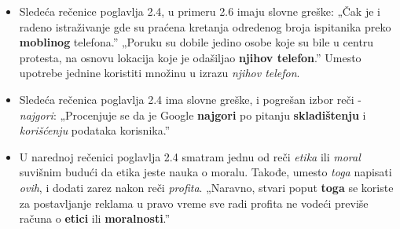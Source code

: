 \documentclass[a4paper]{report}
\newcommand{\odgovor}[1]{\textcolor{blue}{#1}}
\begin{document}
\begin{itemize}
    \item Sledeća rečenice poglavlja 2.4, u primeru 2.6 imaju slovne greške: \newline
    „Čak je i radeno istraživanje gde su praćena kretanja odredenog broja ispitanika preko \textbf{moblinog} telefona.”
    „Poruku su dobile jedino osobe koje su bile u centru protesta, na osnovu lokacija koje je odašiljao \textbf{njihov telefon}.”\newline
    Umesto upotrebe jednine koristiti množinu u izrazu \textit{njihov telefon}.
    
    \odgovor{}
    
\end{itemize}
\begin{itemize}
    \item Sledeća rečenica poglavlja 2.4 ima slovne greške, i pogrešan izbor reči -  \textit{najgori}:\newline
    „Procenjuje se da je Google \textbf{najgori} po pitanju \textbf{skladištenju} i \textit{korišćenju} podataka korisnika.”
    
    \odgovor{}
    
\end{itemize}
\begin{itemize}
    \item U narednoj rečenici poglavlja 2.4 smatram jednu od reči \textit{etika} ili \textit{moral} suvišnim budući da etika jeste nauka o moralu. Takođe, umesto \textit{toga} napisati \textit{ovih}, i dodati zarez nakon reči \textit{profita}.
    \newline
    „Naravno, stvari poput \textbf{toga} se koriste za postavljanje reklama u pravo vreme sve radi profita ne vodeći previše računa o \textbf{etici} ili \textbf{moralnosti}.”
    
    \odgovor{}
    
\end{itemize}
\end{document}
